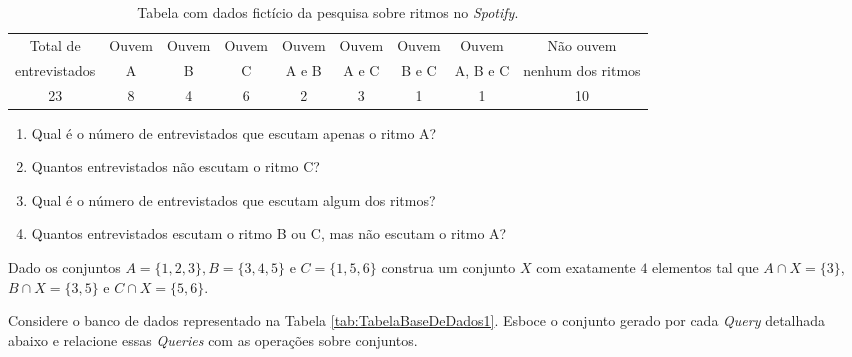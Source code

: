\begin{problemset}
	\begin{table}[h]
		\scriptsize
		\centering
		\begin{tabular}{ccccccccc}
			\hline
			Total de & Ouvem & Ouvem & Ouvem & Ouvem & Ouvem &  Ouvem & Ouvem &   Não ouvem \\
			entrevistados & A & B & C & A e B & A e C & B e C & A, B e C & nenhum dos ritmos  \\
			\hline
			23 & 8 & 4 & 6 & 2 & 3 & 1 & 1 & 10\\
			\hline
		\end{tabular}
		\caption{Tabela com dados fictício da pesquisa sobre ritmos no \textit{Spotify}.}
		\label{tab:TabelaDeDados}
	\end{table}
	\begin{enumerate}
		\item Qual é o número de entrevistados que escutam apenas o ritmo A?
		\item Quantos entrevistados não escutam o ritmo C?
		\item Qual é o número de entrevistados que escutam algum dos ritmos? 
		\item Quantos entrevistados escutam o ritmo B ou C, mas não escutam o ritmo A?
	\end{enumerate}
	\item Dado os conjuntos $A = \{1, 2, 3\}, B = \{3,4,5\}$ e $C = \{1, 5, 6\}$ construa um conjunto $X$ com exatamente $4$ elementos tal que $A \cap X = \{3\}$, $B \cap X =\{3, 5\}$ e $C \cap X = \{5, 6\}$.
	\item Considere o banco de dados representado na Tabela \ref{tab:TabelaBaseDeDados1}. Esboce o conjunto gerado por cada \textit{Query} detalhada abaixo  e relacione essas \textit{Queries} com as operações sobre conjuntos.
	

\end{problemset}
